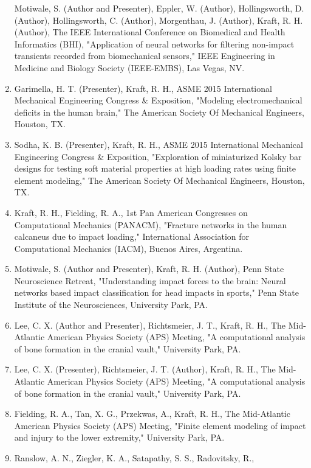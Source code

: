 \documentclass[
]{article}
\begin{document}
\begin{enumerate}
  Motiwale, S. (Author and Presenter), Eppler, W. (Author),
  Hollingsworth, D. (Author), Hollingsworth, C. (Author), Morgenthau, J.
  (Author), Kraft, R. H. (Author), The IEEE International Conference on
  Biomedical and Health Informatics (BHI), "Application of neural
  networks for filtering non-impact transients recorded from
  biomechanical sensors," IEEE Engineering in Medicine and Biology
  Society (IEEE-EMBS), Las Vegas, NV.
\item
  Garimella, H. T. (Presenter), Kraft, R. H., ASME 2015 International
  Mechanical Engineering Congress \& Exposition, "Modeling
  electromechanical deficits in the human brain," The American Society
  Of Mechanical Engineers, Houston, TX.
\item
  Sodha, K. B. (Presenter), Kraft, R. H., ASME 2015 International
  Mechanical Engineering Congress \& Exposition, "Exploration of
  miniaturized Kolsky bar designs for testing soft material properties
  at high loading rates using finite element modeling," The American
  Society Of Mechanical Engineers, Houston, TX.
\item
  Kraft, R. H., Fielding, R. A., 1st Pan American Congresses on
  Computational Mechanics (PANACM), "Fracture networks in the human
  calcaneus due to impact loading," International Association for
  Computational Mechanics (IACM), Buenos Aires, Argentina.
\item
  Motiwale, S. (Author and Presenter), Kraft, R. H. (Author), Penn State
  Neuroscience Retreat, "Understanding impact forces to the brain:
  Neural networks based impact classification for head impacts in
  sports," Penn State Institute of the Neurosciences, University Park,
  PA.
\item
  Lee, C. X. (Author and Presenter), Richtsmeier, J. T., Kraft, R. H.,
  The Mid-Atlantic American Physics Society (APS) Meeting, "A
  computational analysis of bone formation in the cranial vault,"
  University Park, PA.
\item
  Lee, C. X. (Presenter), Richtsmeier, J. T. (Author), Kraft, R. H., The
  Mid-Atlantic American Physics Society (APS) Meeting, "A computational
  analysis of bone formation in the cranial vault," University Park, PA.
\item
  Fielding, R. A., Tan, X. G., Przekwas, A., Kraft, R. H., The
  Mid-Atlantic American Physics Society (APS) Meeting, "Finite element
  modeling of impact and injury to the lower extremity," University
  Park, PA.
\item
  Ranslow, A. N., Ziegler, K. A., Satapathy, S. S., Radovitsky, R.,

\end{enumerate}
\end{document}
